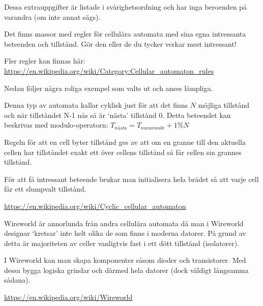 Dessa extrauppgifter är listade i svårighetsordning och har inga beroenden på varandra (om inte annat sägs).



    Det finns massor med regler för cellulära automata med sina egna intressanta beteenden och tillstånd.
    Gör den eller de du tycker verkar mest intressant!

    Fler regler kan finnas här: \url{https://en.wikipedia.org/wiki/Category:Cellular_automaton_rules}

    Nedan följer några roliga exempel som valts ut och anses lämpliga.


        Denna typ av automata kallar cyklisk just för att det finns $N$ möjliga tillstånd och när tillståndet N-1 nås så är `nästa' tillstånd $0$.
        Detta beteendet kan beskrivas med modulo-operatorn: $T_{nästa} = T_{nuvarande} + 1 \% N$

        Regeln för att en cell byter tillstånd ges av att om en granne till den aktuella cellen har tillståndet exakt ett över cellens tillstånd så får cellen sin grannes tillstånd.

        För att få intressant beteende brukar man initialisera hela brädet så att varje cell får ett slumpvalt tillstånd.

        \url{https://en.wikipedia.org/wiki/Cyclic_cellular_automaton}


        Wireworld är annorlunda från andra cellulära automata då man i Wireworld designar `kretsar' inte helt olika de som finns i moderna datorer.
        På grund av detta är majoriteten av celler vanligtvis fast i ett dött tillstånd (isolatorer).

        I Wireworld kan man skapa komponenter såsom dioder och transistorer. Med dessa bygga logiska grindar och därmed hela datorer (dock väldigt långsamma sådana).

        \url{https://en.wikipedia.org/wiki/Wireworld}


